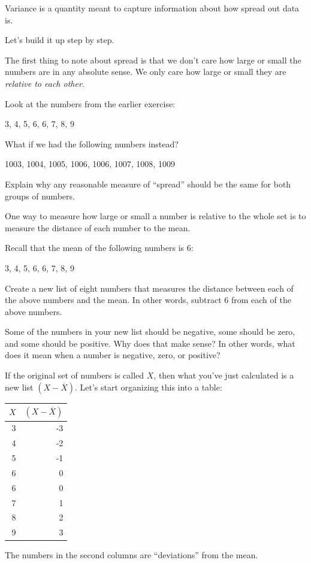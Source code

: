 \documentclass[
]{book}
\begin{document}
Variance is a quantity meant to capture information about how spread out data is.

Let's build it up step by step.

The first thing to note about spread is that we don't care how large or small the numbers are in any absolute sense. We only care how large or small they are \emph{relative to each other}.

Look at the numbers from the earlier exercise:

3, 4, 5, 6, 6, 7, 8, 9

What if we had the following numbers instead?

1003, 1004, 1005, 1006, 1006, 1007, 1008, 1009

Explain why any reasonable measure of ``spread'' should be the same for both groups of numbers.

One way to measure how large or small a number is relative to the whole set is to measure the distance of each number to the mean.

Recall that the mean of the following numbers is 6:

3, 4, 5, 6, 6, 7, 8, 9

Create a new list of eight numbers that measures the distance between each of the above numbers and the mean. In other words, subtract 6 from each of the above numbers.

Some of the numbers in your new list should be negative, some should be zero, and some should be positive. Why does that make sense? In other words, what does it mean when a number is negative, zero, or positive?

If the original set of numbers is called \(X\), then what you've just calculated is a new list \(\left(X - \overline{X}\right)\). Let's start organizing this into a table:

\begin{longtable}[]{@{}rr@{}}
\toprule
\(X\) & \(\left(X - \overline{X}\right)\) \\
\midrule
\endhead
3 & -3 \\
4 & -2 \\
5 & -1 \\
6 & 0 \\
6 & 0 \\
7 & 1 \\
8 & 2 \\
9 & 3 \\
\bottomrule
\end{longtable}

The numbers in the second columns are ``deviations'' from the mean.
\end{document}
